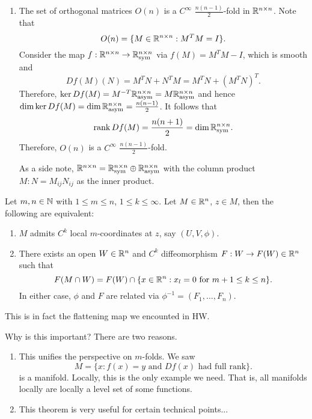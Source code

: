 \documentclass[a4paper]{article}
\begin{document}
\begin{eg}
\begin{enumerate}
\item The set of orthogonal matrices $O(n)$ is a 
$C^\infty$ $\frac{n (n - 1)}{2}$-fold in $\mathbb{R}^{n \times n}$.
Note that 
\[
O(n) = \{M \in \mathbb{R}^{n \times n} : M^T M = I\}.
\]
Consider the map $f : \mathbb{R}^{n \times n} \to \mathbb{R}^{n \times n}_{\text{sym}}$
via $f(M) = M^T M - I$, which is smooth and 
\[
Df(M)(N) = M^T N + N^T M = M^T N + (M^T N)^T.
\]
Therefore, $\ker Df(M) = M^{-T} \mathbb{R}^{n \times n}_{\text{asym}}
= M \mathbb{R}^{n \times n}_{\text{asym}}$ and hence 
$\dim \ker Df(M) = \dim \mathbb{R}^{n \times n}_{\text{asym}}
= \frac{n (n - 1)}{2}$. It follows that 
\[
\operatorname{rank} Df(M) = \frac{n (n + 1)}{2} = \dim \mathbb{R}^{n \times n}_{\text{sym}}.
\]
Therefore, $O(n)$ is a $C^\infty$ $\frac{n(n-1)}{2}$-fold.

As a side note, $\mathbb{R}^{n \times n} = \mathbb{R}^{n \times n}_{\text{sym}} 
\oplus \mathbb{R}^{n \times n}_{\text{asym}}$ with the column product 
$M : N = M_{ij} N_{ij}$ as the inner product.
\end{enumerate}
\end{eg}

\begin{thm}
Let $m, n \in \mathbb{N}$ with $1 \leq m \leq n$, $1 \leq k \leq \infty$.
Let $M \in \mathbb{R}^n$, $z \in M$, then the following are equivalent:
\begin{enumerate}
\item $M$ admits $C^k$ local $m$-coordinates at $z$, 
say $(U, V, \phi)$.

\item There exists an open $W \in \mathbb{R}^n$ and $C^k$ diffeomorphism
$F : W \to F(W) \in \mathbb{R}^n$ such that 
\[
F(M \cap W) = F(W) \cap \{x \in \mathbb{R}^n : x_l = 0 \text{ for 
$m + 1 \leq k \leq n$}\}.
\]
In either case, $\phi$ and $F$ are related via 
$\phi^{-1} = (F_1, \dots, F_n)$.
\end{enumerate}
\end{thm}

This is in fact the flattening map we encounted in HW.

Why is this important? There are two reasons. 
\begin{enumerate}
\item This unifies the perspective on $m$-folds. We saw 
\[
M = \{x : \text{$f(x) = y$ and $Df(x)$ had full rank}\}.
\]
is a manifold. Locally, this is the only example we need.
That is, all manifolds locally are locally a level set of 
some functions.

\item This theorem is very useful for certain technical
points...
\end{enumerate}
\end{document}
